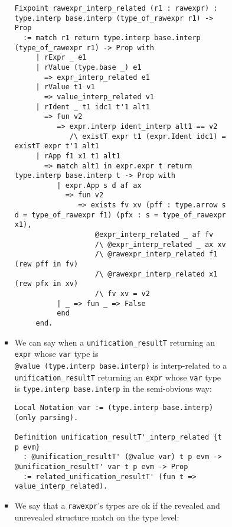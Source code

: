 \documentclass[
]{article}
\begin{document}
\begin{itemize}
\begin{itemize}
\begin{itemize}
\begin{itemize}
\begin{itemize}
\begin{itemize}
\begin{verbatim}
Fixpoint rawexpr_interp_related (r1 : rawexpr) : type.interp base.interp (type_of_rawexpr r1) -> Prop
  := match r1 return type.interp base.interp (type_of_rawexpr r1) -> Prop with
     | rExpr _ e1
     | rValue (type.base _) e1
       => expr_interp_related e1
     | rValue t1 v1
       => value_interp_related v1
     | rIdent _ t1 idc1 t'1 alt1
       => fun v2
          => expr.interp ident_interp alt1 == v2
             /\ existT expr t1 (expr.Ident idc1) = existT expr t'1 alt1
     | rApp f1 x1 t1 alt1
       => match alt1 in expr.expr t return type.interp base.interp t -> Prop with
          | expr.App s d af ax
            => fun v2
               => exists fv xv (pff : type.arrow s d = type_of_rawexpr f1) (pfx : s = type_of_rawexpr x1),
                   @expr_interp_related _ af fv
                   /\ @expr_interp_related _ ax xv
                   /\ @rawexpr_interp_related f1 (rew pff in fv)
                   /\ @rawexpr_interp_related x1 (rew pfx in xv)
                   /\ fv xv = v2
          | _ => fun _ => False
          end
     end.
\end{verbatim}
          \item
            We can say when a
            \texttt{unification\_resultT\textquotesingle{}} returning an
            \texttt{expr} whose \texttt{var} type is
            \texttt{@value\ (type.interp\ base.interp)} is
            interp-related to a
            \texttt{unification\_resultT\textquotesingle{}} returning an
            \texttt{expr} whose \texttt{var} type is
            \texttt{type.interp\ base.interp} in the semi-obvious way:

\begin{verbatim}
Local Notation var := (type.interp base.interp) (only parsing).

Definition unification_resultT'_interp_related {t p evm}
  : @unification_resultT' (@value var) t p evm -> @unification_resultT' var t p evm -> Prop
  := related_unification_resultT' (fun t => value_interp_related).
\end{verbatim}
          \item
            We say that a \texttt{rawexpr}'s types are ok if the
            revealed and unrevealed structure match on the type level:


\end{itemize}
\end{itemize}
\end{itemize}
\end{itemize}
\end{itemize}
\end{itemize}
\end{document}
